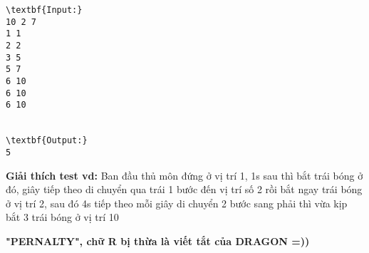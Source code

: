 \begin{verbatim}
\textbf{Input:}
10 2 7
1 1
2 2
3 5
5 7
6 10
6 10
6 10


\textbf{Output:}
5
\end{verbatim}

\textbf{    Giải thích test vd:   }   Ban đầu thủ môn đứng ở vị trí 1, 1s sau thì bắt trái bóng ở đó, giây tiếp theo di chuyển qua trái 1 bước đến vị trí số 2 rồi bắt ngay trái bóng ở vị trí 2, sau đó 4s tiếp theo mỗi giây di chuyển 2 bước sang phải thì vừa kịp bắt 3 trái bóng ở vị trí 10   


\textbf{    "PERNALTY", chữ R bị thừa là viết tắt của DRAGON =))   }